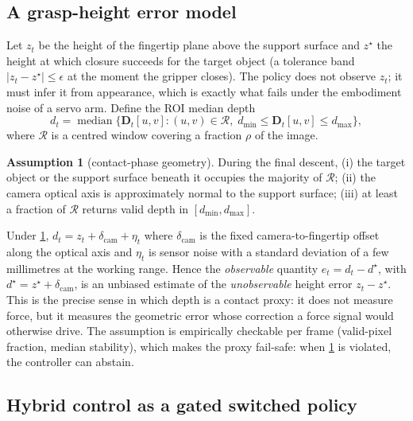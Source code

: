 \documentclass[11pt,a4paper]{article}
\theoremstyle{definition}
\newtheorem{assumption}{Assumption}
\newcommand{\depthmap}{\bm{D}}
\begin{document}
\subsection{A grasp-height error model}
\label{sec:errormodel}

Let $z_t$ be the height of the fingertip plane above the support surface and $z^\star$ the height at which closure succeeds for the target object (a tolerance band $|z_t - z^\star|\le\epsilon$ at the moment the gripper closes). The policy does not observe $z_t$; it must infer it from appearance, which is exactly what fails under the embodiment noise of a servo arm. Define the ROI median depth
\begin{equation}
d_t = \operatorname{median}\big\{\depthmap_t[u,v] : (u,v)\in\mathcal{R},\; d_{\min}\le \depthmap_t[u,v]\le d_{\max}\big\},
\label{eq:roi}
\end{equation}
where $\mathcal{R}$ is a centred window covering a fraction $\rho$ of the image.

\begin{assumption}[contact-phase geometry]\label{as:geom}
During the final descent, (i) the target object or the support surface beneath it occupies the majority of $\mathcal{R}$; (ii) the camera optical axis is approximately normal to the support surface; (iii) at least a fraction of $\mathcal{R}$ returns valid depth in $[d_{\min},d_{\max}]$.
\end{assumption}

Under \cref{as:geom}, $d_t = z_t + \delta_{\mathrm{cam}} + \eta_t$ where $\delta_{\mathrm{cam}}$ is the fixed camera-to-fingertip offset along the optical axis and $\eta_t$ is sensor noise with a standard deviation of a few millimetres at the working range. Hence the \emph{observable} quantity $e_t = d_t - d^\star$, with $d^\star = z^\star+\delta_{\mathrm{cam}}$, is an unbiased estimate of the \emph{unobservable} height error $z_t - z^\star$. This is the precise sense in which depth is a contact proxy: it does not measure force, but it measures the geometric error whose correction a force signal would otherwise drive. The assumption is empirically checkable per frame (valid-pixel fraction, median stability), which makes the proxy fail-safe: when \cref{as:geom} is violated, the controller can abstain.

\subsection{Hybrid control as a gated switched policy}
\end{document}

